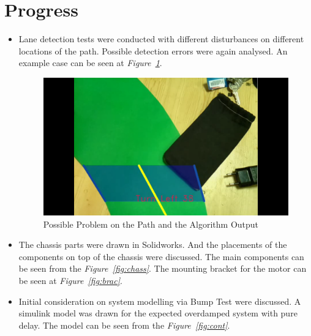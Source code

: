 \documentclass[a4paper,12pt]{article}
\begin{document}
\section{Progress}
\begin{itemize}
	\item Lane detection tests were conducted with different disturbances on different locations of the path. Possible detection errors were again analysed. An example case can be seen at \textit{Figure~\ref{fig:lane-analysis-1}}.

		\begin{figure}[H]
			\center
			\setlength{\unitlength}{\textwidth} 
			\includegraphics[width=0.75\unitlength]{lane_det}
			\caption{\label{fig:lane-analysis-1} Possible Problem on the Path and the Algorithm Output}
		\end{figure}
			
	 \item The chassis parts were drawn in Solidworks. And the placements of the components on top of the chassis were discussed. The main components can be seen from the \textit{Figure~\ref{fig:chass}}. The mounting bracket for the motor can be seen at \textit{Figure~\ref{fig:brac}}. 
	 
	 \item Initial consideration on system modelling via Bump Test were discussed. A simulink model was drawn for the expected overdamped system with pure delay. The model can be seen from the \textit{Figure~\ref{fig:cont}}.  
    

\end{itemize}
\end{document}
